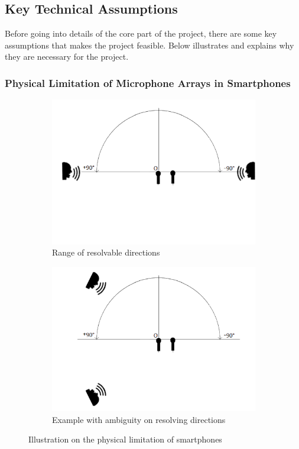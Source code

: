 \documentclass[a4paper,twoside,12pt,hidelinks]{article}
\begin{document}
\subsection{Key Technical Assumptions}
Before going into details of the core part of the project, there are some key assumptions that makes the project feasible. Below illustrates and explains why they are necessary for the project.
\subsubsection{Physical Limitation of Microphone Arrays in Smartphones}
\begin{figure}[H]
\centering
\begin{subfigure}[t]{0.49\textwidth}
\includegraphics[width=\textwidth]{microphone1}
\caption{Range of resolvable directions}
\label{fig:resolvemicrophone}
\end{subfigure}
\begin{subfigure}[t]{0.49\textwidth}
\includegraphics[width=\textwidth]{microphone2}
\caption{Example with ambiguity on resolving directions}
\label{fig:unresolvablemicrophone}
\end{subfigure}
\caption{Illustration on the physical limitation of smartphones}
\label{fig:microphone}
\end{figure}
\end{document}
